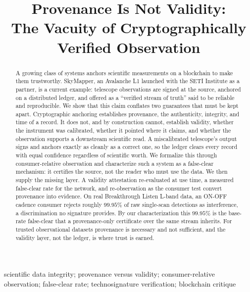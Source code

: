 \documentclass[conference]{IEEEtran}
\begin{document}
\title{Provenance Is Not Validity:\\ The Vacuity of Cryptographically Verified Observation}
\author{
}
\maketitle

\begin{abstract}
A growing class of systems anchors scientific measurements on a blockchain to
make them trustworthy. SkyMapper, an Avalanche L1 launched with the SETI
Institute as a partner, is a current example: telescope observations are signed
at the source, anchored on a distributed ledger, and offered as a ``verified
stream of truth'' said to be reliable and reproducible. We show that this claim
conflates two guarantees that must be kept apart. Cryptographic anchoring establishes provenance, the authenticity,
integrity, and time of a record. It does not, and by construction cannot,
establish validity, whether the instrument was calibrated, whether it pointed
where it claims, and whether the observation supports a downstream scientific
read. A miscalibrated telescope's output signs and anchors exactly as cleanly as
a correct one, so the ledger clears every record with equal confidence
regardless of scientific worth. We formalize this through consumer-relative
observation and characterize such a system as a false-clear mechanism: it
certifies the source, not the reader who must use the data. We then supply the
missing layer. A validity attestation re-evaluated at use time, a measured
false-clear rate for the network, and re-observation as the consumer test
convert provenance into evidence. On real Breakthrough Listen L-band data, an
ON-OFF cadence consumer rejects roughly $99.95\%$ of raw single-scan detections
as interference, a discrimination no signature provides. By our characterization
this $99.95\%$ is the base-rate false-clear that a provenance-only certificate
over the same stream inherits. For trusted observational datasets provenance is
necessary and not sufficient, and the
validity layer, not the ledger, is where trust is earned.
\end{abstract}

\begin{IEEEkeywords}
scientific data integrity; provenance versus validity; consumer-relative
observation; false-clear rate; technosignature verification; blockchain critique
\end{IEEEkeywords}
\end{document}
